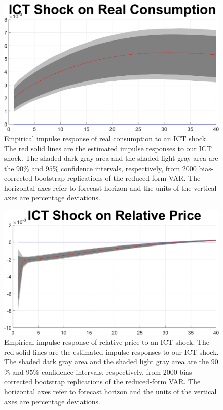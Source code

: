\documentclass[12pt]{article}
\begin{document}
	\begin{figure}[h!]
	\begin{center}
		\includegraphics[scale=0.35]{MainFigures/fig_ICT_Shock_on_Real_Consumption_empirical_noH}
		\caption{Empirical impulse response of real consumption to an ICT shock. The red solid lines are the estimated impulse responses to our ICT shock. The shaded dark gray area and the shaded light gray area are the $90$\% and $95$\% confidence intervals, respectively, from 2000 bias-corrected bootstrap replications of the reduced-form VAR. The horizontal axes refer to forecast horizon and the units of the vertical axes are percentage deviations.}
		\label{fig:C_main}
	\end{center} 
\end{figure}


	\begin{figure}[h!]
	\begin{center}
		\includegraphics[scale=0.35]{MainFigures/fig_ICT_Shock_on_Relative_Price_empirical_noH}
		\caption{Empirical impulse response of relative price to an ICT shock. The red solid lines are the estimated impulse responses to our ICT shock. The shaded dark gray area and the shaded light gray area are the $90$\% and $95$\% confidence intervals, respectively, from 2000 bias-corrected bootstrap replications of the reduced-form VAR. The horizontal axes refer to forecast horizon and the units of the vertical axes are percentage deviations.}
		\label{fig:RP_main}
	\end{center} 
\end{figure}

 
 
 
 
\end{document}
